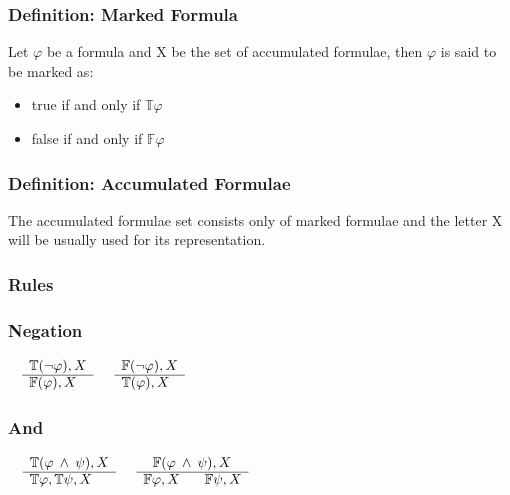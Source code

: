 \documentclass{article}
\begin{document}
		\subsubsection*{Definition: Marked Formula} 
			Let $\varphi$ be a formula and X be the set of accumulated formulae, then $\varphi$ is said to be marked as:
			\begin{itemize}
				\item true if and only if $\mathbb{T}\varphi$
				\item false if and only if $\mathbb{F}\varphi$
			\end{itemize}

		\subsubsection*{Definition: Accumulated Formulae}
			The accumulated formulae set consists only of marked formulae and the letter X will be usually used for its representation.

		\subsubsection{Rules}
		\subsubsection*{Negation}
			$\begin{array}{rl}
				& \mathbb{T}(\neg \varphi), X \\
			      \cline{2-2}
			      & \mathbb{F}(\varphi), X
			\end{array}$
			\:\:\:\:\:\:\:\:\:\:\:\:\:\:\:\:\:\:\:\:\:\:\:\:\:\:\:\:\:\:\:\:\:\:\:\:\:\:\:\:\:\:\:\:\:\:\:\:
			$\begin{array}{rl}
				& \mathbb{F}(\neg \varphi), X \\
			      \cline{2-2}
			      & \mathbb{T}(\varphi), X
			\end{array}$

		\subsubsection*{And}
			$\begin{array}{rl}
				& \mathbb{T}(\varphi \: \wedge \: \psi), X \\
			      \cline{2-2}
			      & \mathbb{T}\varphi, \mathbb{T}\psi, X
			\end{array}$
			\:\:\:\:\:\:\:\:\:\:\:\:\:\:\:\:\:\:\:\:\:\:\:\:\:\:\:\:\:\:\:\:\:\:\:
			$\begin{array}{rl}
				& \:\:\: \mathbb{F}(\varphi \: \wedge \: \psi), X \\
			      \cline{2-2}
			      & \mathbb{F}\varphi, X \:\:\:\:\:\:\:\: \mathbb{F}\psi, X
			\end{array}$
\end{document}
